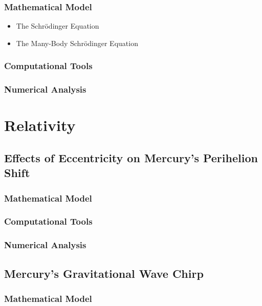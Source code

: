 \documentclass{report}
\begin{document}
        \subsection{Mathematical Model}

            \begin{itemize}
                \item The Schr{\"o}dinger Equation
                \item The Many-Body Schr{\"o}dinger Equation
            \end{itemize}

        \subsection{Computational Tools}

        \subsection{Numerical Analysis}

\chapter{Relativity} \label{sec:relativity}

    \section{Effects of Eccentricity on Mercury's Perihelion Shift}

        \subsection{Mathematical Model}

        \subsection{Computational Tools}

        \subsection{Numerical Analysis}

    \section{Mercury's Gravitational Wave Chirp}

        \subsection{Mathematical Model}
\end{document}
